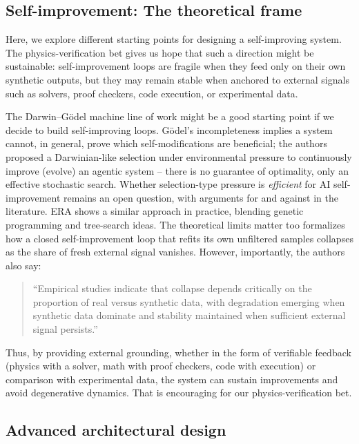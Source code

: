 \subsection{Self-improvement: The theoretical frame}
\label{section:self_improvement}

\begin{summarybox}
Here, we explore different starting points for designing a self-improving system. The physics-verification bet gives us hope that such a direction might be sustainable: self-improvement loops are fragile when they feed only on their own synthetic outputs, but they may remain stable when anchored to external signals such as solvers, proof checkers, code execution, or experimental data.
\end{summarybox}


The Darwin--Gödel machine line of work \cite{2505.22954}
might be a good starting point if we decide to build self-improving loops. Gödel's incompleteness implies a system cannot, in general, prove which self-modifications are beneficial; the authors proposed a Darwinian-like selection under environmental pressure to continuously improve (evolve) an agentic system  -- there is no guarantee of optimality, only an effective stochastic search. Whether selection-type pressure is \emph{efficient} for AI self-improvement remains an open question, with arguments for and against in the literature. ERA \cite{Aygn2026} shows a similar approach in practice, blending genetic programming and tree-search ideas.
The theoretical limits matter too \cite{2601.05280} formalizes how a closed self-improvement loop that refits its own unfiltered samples collapses as the share of fresh external signal vanishes. However, importantly, the authors also say:
\begin{quotation}
    \noindent ``Empirical studies indicate that collapse depends critically on the proportion of real versus synthetic
    data, with degradation emerging when synthetic data dominate and stability maintained when sufficient external signal persists.''
\end{quotation}
Thus, by providing external grounding, whether in the form of verifiable feedback (physics with a solver, math with proof checkers, code with execution) or comparison with experimental data, the system can sustain improvements and avoid degenerative dynamics. That is encouraging for our physics-verification bet.

\clearpage
\subsection{Advanced architectural design}
\label{section:advanced_architecture}

